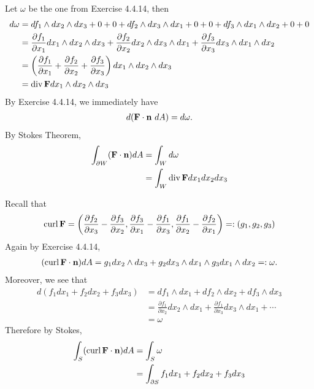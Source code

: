 \documentclass[12pt,class=article,crop=false]{standalone}
\begin{document}
\begin{problem}[4.7.3]
Let $ \omega$ be the one from Exercise 4.4.14, then
\begin{align*}
	d \omega &= df_1 \wedge dx_2 \wedge dx_3 + 0 + 0 + df_2 \wedge dx_3 \wedge dx_1 + 0 + 0 + df_3 \wedge dx_1 \wedge dx_2 +0+0\\
	&= \frac{\partial f_1}{\partial x_1} dx_1 \wedge dx_2 \wedge dx_3 + \frac{\partial f_2}{\partial x_2} dx_2 \wedge dx_3 \wedge  d x_1 + \frac{\partial f_3}{\partial x_3} dx_3 \wedge dx_1 \wedge dx_2 \\
	&= \left( \frac{\partial f_1}{\partial x_1}+ \frac{\partial f_2}{\partial x_2} + \frac{\partial f_3}{\partial x_3}   \right) dx_1 \wedge dx_2 \wedge dx_3\\
	&= \operatorname{div} {\mathbf{F}} dx_1 \wedge dx_2 \wedge dx_3 
\end{align*}
By Exercise 4.4.14, we immediately have
\begin{align*}
d({\mathbf{F}} \cdot {\mathbf{n}}\ dA) = d\omega.
\end{align*}
By Stokes Theorem,
\begin{align*}
	\int_{\partial W } ({\mathbf{F}} \cdot {\mathbf{ n}}) dA &= \int_W d \omega \\
	&= \int_{W} \operatorname{div} {\mathbf{ F}} dx_1 dx_2 dx_3 
\end{align*}
\end{problem}
\begin{problem}[4.7.4]
Recall that
\begin{align*}
	\operatorname{curl} {\mathbf{ F}} = \left( \frac{\partial f_2}{\partial x_3} - \frac{\partial f_3}{\partial x_2}, \frac{\partial f_3}{\partial x_1} -\frac{\partial f_1}{\partial x_3}, \frac{\partial f_1}{\partial x_2}- \frac{\partial f_2}{\partial x_1} \right) =: (g_1,g_2,g_3)
\end{align*}
Again by Exercise 4.4.14,
\begin{align*}
	(\operatorname{curl} {\mathbf{ F}} \cdot {\mathbf{ n}}) dA = g_1 dx_2 \wedge dx_3+ g_2 dx_3 \wedge dx_1 \wedge g_3 dx_1 \wedge dx_2 =: \omega.
\end{align*}
Moreover, we see that
\begin{align*}
	d(f_1 dx_1 + f_2 dx_2 + f_3 dx_3) &= df_1 \wedge dx_1 + df_2 \wedge dx_2 + df_3 \wedge dx_3 \\
	&= \frac{\partial f_1}{\partial x_2} dx_2 \wedge dx_1 + \frac{\partial f_1}{\partial x_3} dx_3 \wedge dx_1 + \cdots  \\
	&= \omega 
\end{align*}
Therefore by Stokes,
\begin{align*}
	\int_S (\operatorname{curl} {\mathbf{ F}} \cdot {\mathbf{ n}} ) dA &= \int_S \omega \\
	&= \int_{ \partial S} f_1 dx_1 + f_2 dx_2 + f_3 dx_3 
\end{align*}
\end{problem}
\end{document}
